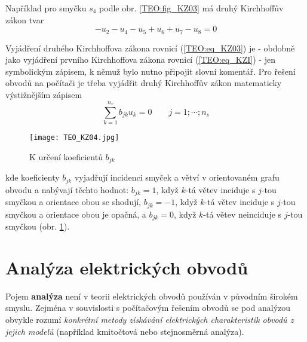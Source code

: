       Například pro smyčku \(s_4\) podle obr. \ref{TEO:fig_KZ03} má druhý Kirchhoffův zákon tvar
      \begin{equation*}
        -u_2 -u_4 -u_5 +u_6 +u_7 -u_8 = 0
      \end{equation*}
      
      Vyjádření druhého Kirchhoffova zákona rovnicí (\ref{TEO:eq_KZ03}) je - obdobně jako vyjádření 
      prvního Kirchhoffova zákona rovnicí (\ref{TEO:eq_KZI}) - jen symbolickým zápisem, k němuž 
      bylo nutno připojit slovní komentář. Pro řešení obvodů na počítači je třeba vyjádřit druhý 
      Kirchhoffův zákon matematicky výstižnějším zápisem
      \begin{equation}\label{TEO:eq_KZ04}
        \sum\limits_{k=1}^{n_v} b_{jk} u_k = 0 \qquad j=1;\cdots; n_s
      \end{equation}      
      \begin{figure}[ht!]
        \centering
        \texttt{[image: TEO\_KZ04.jpg]}
        \caption{K určení koeficientů \(b_{jk}\) \cite[s.~49]{Meyer1978}}
        \label{TEO:fig_KZ04}
      \end{figure}      
      kde koeficienty \(b_{jk}\) vyjadřují incidenci smyček a větví v orientovaném grafu obvodu a 
      nabývají těchto hodnot: \(b_{jk} = 1\), když \(k\)-tá větev inciduje s \(j\)-tou smyčkou a 
      orientace obou se shodují, \(b_{jk} = - 1\), když \(k\)-tá větev inciduje s \(j\)-tou smyčkou 
      a orientace obou je opačná, a \(b_{jk} = 0\), když \(k\)-tá větev neinciduje s \(j\)-tou 
      smyčkou (obr. \ref{TEO:fig_KZ04}).
      
  \section{Analýza elektrických obvodů}
    Pojem \textbf{analýza} není v teorii elektrických obvodů používán v původním širokém smyslu. 
    Zejména v souvislosti s počítačovým řešením obvodů se pod analýzou obvykle rozumí 
    \emph{konkrétní metody získávání elektrických charakteristik obvodů z jejich modelů} (například 
    kmitočtová nebo stejnosměrná analýza).
    
